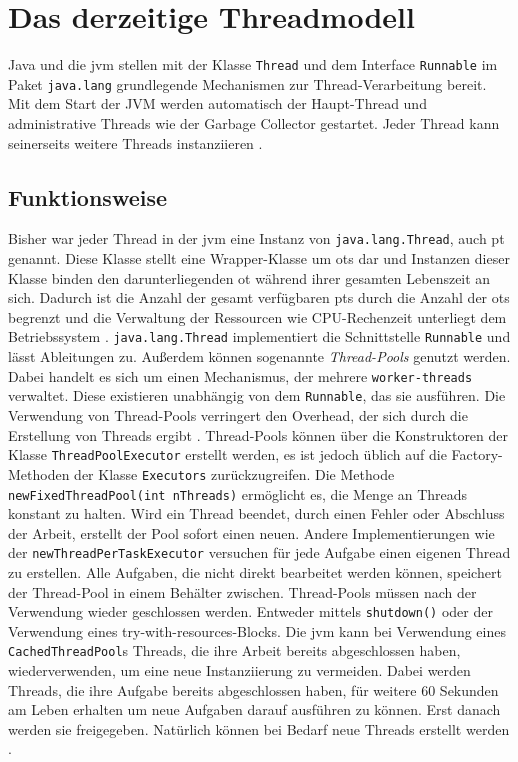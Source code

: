\chapter{Das derzeitige Threadmodell}
\label{cha:DasDerzeitigeThreadmodell}                   %
    Java und die \gls{jvm} stellen mit der Klasse \texttt{Thread} und dem Interface \texttt{Runnable} im Paket \texttt{java.lang} grundlegende Mechanismen zur Thread-Verarbei\-tung bereit.
    Mit dem Start der JVM werden automatisch der Haupt-Thread und administrative Threads wie der Garbage Collector gestartet. Jeder Thread kann seinerseits weitere Threads instanziieren \cite{GrundKursBS}.
  
\section{Funktionsweise}                                         
\label{sec:Funktionsweise}

    Bisher war jeder Thread in der \gls{jvm} eine Instanz von \texttt{java.lang.Thread}, auch \gls{pt} genannt. Diese Klasse stellt eine Wrapper-Klasse um \Glspl{ot} dar und Instanzen dieser Klasse
    binden den darunterliegenden \gls{ot}  während ihrer gesamten Lebenszeit an sich. Dadurch ist die Anzahl der gesamt verfügbaren \Glspl{pt} durch die Anzahl der \Glspl{ot} begrenzt und die Verwaltung
    der Ressourcen wie CPU-Rechenzeit unterliegt dem Betriebssystem \cite{JEP425}.
    \texttt{java.lang.Thread} implementiert die Schnittstelle \texttt{Runnable} und lässt Ableitungen zu.
    Außerdem können sogenannte \emph{Thread-Pools} genutzt werden. Dabei handelt es sich um einen Mechanismus, der mehrere \texttt{worker-threads} verwaltet. Diese existieren unabhängig von dem \texttt{Runnable},
    das sie ausführen. Die Verwendung von Thread-Pools verringert den Overhead, der sich durch die Erstellung von Threads ergibt \cite{ThreadPool}. Thread-Pools können über die Konstruktoren der Klasse 
    \texttt{ThreadPoolExecutor}
    erstellt werden, es ist jedoch üblich auf die Factory-Methoden der Klasse \texttt{Executors} zurückzugreifen. Die Methode \texttt{newFixedThreadPool(int nThreads)} ermöglicht es, 
    die Menge an Threads konstant zu halten. Wird ein Thread beendet, durch einen Fehler oder Abschluss der Arbeit, erstellt der Pool sofort einen neuen. Andere Implementierungen wie der 
    \texttt{newThread\-PerTaskExecutor} versuchen für jede Aufgabe einen eigenen Thread zu erstellen. Alle Aufgaben, die nicht direkt bearbeitet werden können, 
    speichert der Thread-Pool in einem Behälter zwischen. Thread-Pools müssen nach der Verwendung wieder geschlossen werden. Entweder mittels \texttt{shutdown()} oder der Verwendung eines
    try-with-resources-Blocks.
    Die \gls{jvm} kann bei Verwendung eines \texttt{CachedThreadPool}s Threads, die ihre Arbeit bereits 
    abgeschlossen haben, wiederverwenden, um eine neue Instanziierung zu vermeiden. Dabei werden Threads, die ihre Aufgabe bereits abgeschlossen haben, für weitere 60 Sekunden am Leben erhalten um 
    neue Aufgaben darauf ausführen zu können. Erst danach werden sie freigegeben. Natürlich können bei Bedarf neue Threads erstellt werden \cite{Executors}.

